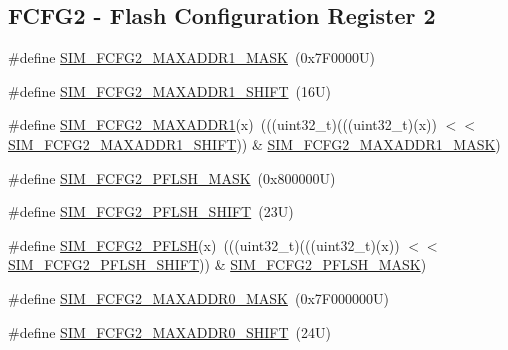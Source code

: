 \subsection*{F\+C\+F\+G2 -\/ Flash Configuration Register 2}
\begin{DoxyCompactItemize}
\item 
\#define \mbox{\hyperlink{group___s_i_m___register___masks_ga4a9efde69ef5ab882d94b4ff6f659493}{S\+I\+M\+\_\+\+F\+C\+F\+G2\+\_\+\+M\+A\+X\+A\+D\+D\+R1\+\_\+\+M\+A\+SK}}~(0x7\+F0000\+U)
\item 
\#define \mbox{\hyperlink{group___s_i_m___register___masks_ga4efd23d8fd9d589919b9b211ab523e09}{S\+I\+M\+\_\+\+F\+C\+F\+G2\+\_\+\+M\+A\+X\+A\+D\+D\+R1\+\_\+\+S\+H\+I\+FT}}~(16\+U)
\item 
\#define \mbox{\hyperlink{group___s_i_m___register___masks_gaadeff570babcc1f87581f48ca4d2951f}{S\+I\+M\+\_\+\+F\+C\+F\+G2\+\_\+\+M\+A\+X\+A\+D\+D\+R1}}(x)~(((uint32\+\_\+t)(((uint32\+\_\+t)(x)) $<$$<$ \mbox{\hyperlink{group___s_i_m___register___masks_ga4efd23d8fd9d589919b9b211ab523e09}{S\+I\+M\+\_\+\+F\+C\+F\+G2\+\_\+\+M\+A\+X\+A\+D\+D\+R1\+\_\+\+S\+H\+I\+FT}})) \& \mbox{\hyperlink{group___s_i_m___register___masks_ga4a9efde69ef5ab882d94b4ff6f659493}{S\+I\+M\+\_\+\+F\+C\+F\+G2\+\_\+\+M\+A\+X\+A\+D\+D\+R1\+\_\+\+M\+A\+SK}})
\item 
\#define \mbox{\hyperlink{group___s_i_m___register___masks_ga4d534ca03b47525916b93f9b2000d49a}{S\+I\+M\+\_\+\+F\+C\+F\+G2\+\_\+\+P\+F\+L\+S\+H\+\_\+\+M\+A\+SK}}~(0x800000\+U)
\item 
\#define \mbox{\hyperlink{group___s_i_m___register___masks_ga6ebc783954b7a0846e166efc03ca3a30}{S\+I\+M\+\_\+\+F\+C\+F\+G2\+\_\+\+P\+F\+L\+S\+H\+\_\+\+S\+H\+I\+FT}}~(23\+U)
\item 
\#define \mbox{\hyperlink{group___s_i_m___register___masks_ga3b696271410fbf10b8b372594bae20d8}{S\+I\+M\+\_\+\+F\+C\+F\+G2\+\_\+\+P\+F\+L\+SH}}(x)~(((uint32\+\_\+t)(((uint32\+\_\+t)(x)) $<$$<$ \mbox{\hyperlink{group___s_i_m___register___masks_ga6ebc783954b7a0846e166efc03ca3a30}{S\+I\+M\+\_\+\+F\+C\+F\+G2\+\_\+\+P\+F\+L\+S\+H\+\_\+\+S\+H\+I\+FT}})) \& \mbox{\hyperlink{group___s_i_m___register___masks_ga4d534ca03b47525916b93f9b2000d49a}{S\+I\+M\+\_\+\+F\+C\+F\+G2\+\_\+\+P\+F\+L\+S\+H\+\_\+\+M\+A\+SK}})
\item 
\#define \mbox{\hyperlink{group___s_i_m___register___masks_gad1096c0a75d0bf4dfc93f4b1957fe493}{S\+I\+M\+\_\+\+F\+C\+F\+G2\+\_\+\+M\+A\+X\+A\+D\+D\+R0\+\_\+\+M\+A\+SK}}~(0x7\+F000000\+U)
\item 
\#define \mbox{\hyperlink{group___s_i_m___register___masks_ga3ccb8fde0ef2e170d0c84cdfa3651d34}{S\+I\+M\+\_\+\+F\+C\+F\+G2\+\_\+\+M\+A\+X\+A\+D\+D\+R0\+\_\+\+S\+H\+I\+FT}}~(24\+U)

\end{DoxyCompactItemize}
